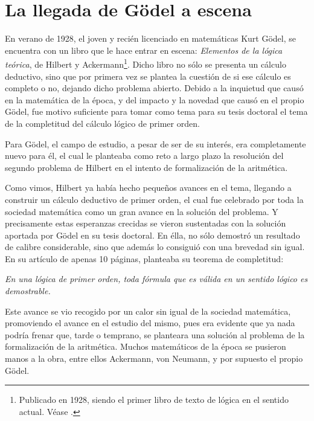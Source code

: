\section{La llegada de Gödel a escena} 

En verano de 1928, el joven y recién licenciado en matemáticas Kurt Gödel, se encuentra con un libro que le hace entrar en escena: \textit{Elementos de la lógica teórica}, de 
Hilbert y Ackermann\footnote{Publicado en 1928, siendo el primer libro de texto de lógica en el sentido actual. Véase \cite{hilbert1962elementos}.}. Dicho libro no sólo se presenta un cálculo deductivo, 
sino que por primera vez se plantea la cuestión de si ese cálculo es completo o no, dejando dicho problema abierto. Debido a la inquietud que causó en la matemática de la época,
y del impacto y la novedad que causó en el propio Gödel, fue motivo suficiente para tomar como tema para su tesis doctoral el tema de la completitud del cálculo lógico de primer orden.

Para Gödel, el campo de estudio, a pesar de ser de su interés, era completamente nuevo para él, el cual le planteaba como reto a largo plazo la resolución del segundo problema
de Hilbert en el intento de formalización de la aritmética. 

Como vimos, Hilbert ya había hecho pequeños avances en el tema, llegando a construir un cálculo deductivo de primer orden, el cual fue celebrado por toda la sociedad matemática 
como un gran avance en la solución del problema. Y precisamente estas esperanzas crecidas se vieron sustentadas con la solución aportada por Gödel en su tesis doctoral. En élla, 
no sólo demostró un resultado de calibre considerable, sino que además lo consiguió con una brevedad sin igual. En su artículo de apenas 10 páginas, planteaba su teorema de completitud:

\begin{center}
    \textit{En una lógica de primer orden, toda fórmula que es válida en un sentido lógico es demostrable.}
\end{center}

Este avance se vio recogido por un calor sin igual de la sociedad matemática, promoviendo el avance en el estudio del mismo, pues era evidente que ya nada podría frenar que, tarde o 
temprano, se planteara una solución al problema de la formalización de la aritmética. Muchos matemáticos de la época se pusieron manos a la obra, entre ellos Ackermann, von Neumann,
y por supuesto el propio Gödel.

